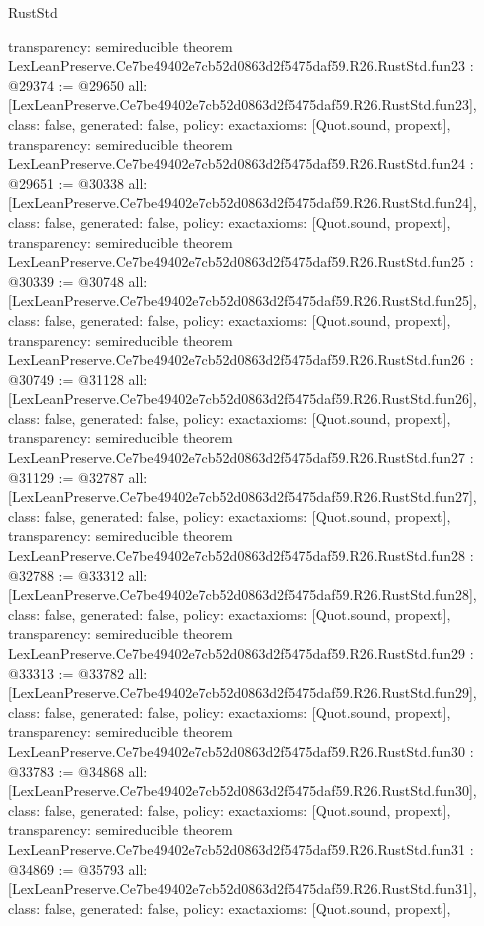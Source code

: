 \begin{lexlean}{RustStd}
\begin{coremodule}
{  transparency: semireducible
}
theorem LexLeanPreserve.Ce7be49402e7cb52d0863d2f5475daf59.R26.RustStd.fun23 : @29374 := @29650 {
  all: [LexLeanPreserve.Ce7be49402e7cb52d0863d2f5475daf59.R26.RustStd.fun23],
  class: false,
  generated: false,
  policy: exact{axioms: [Quot.sound, propext]},
  transparency: semireducible
}
theorem LexLeanPreserve.Ce7be49402e7cb52d0863d2f5475daf59.R26.RustStd.fun24 : @29651 := @30338 {
  all: [LexLeanPreserve.Ce7be49402e7cb52d0863d2f5475daf59.R26.RustStd.fun24],
  class: false,
  generated: false,
  policy: exact{axioms: [Quot.sound, propext]},
  transparency: semireducible
}
theorem LexLeanPreserve.Ce7be49402e7cb52d0863d2f5475daf59.R26.RustStd.fun25 : @30339 := @30748 {
  all: [LexLeanPreserve.Ce7be49402e7cb52d0863d2f5475daf59.R26.RustStd.fun25],
  class: false,
  generated: false,
  policy: exact{axioms: [Quot.sound, propext]},
  transparency: semireducible
}
theorem LexLeanPreserve.Ce7be49402e7cb52d0863d2f5475daf59.R26.RustStd.fun26 : @30749 := @31128 {
  all: [LexLeanPreserve.Ce7be49402e7cb52d0863d2f5475daf59.R26.RustStd.fun26],
  class: false,
  generated: false,
  policy: exact{axioms: [Quot.sound, propext]},
  transparency: semireducible
}
theorem LexLeanPreserve.Ce7be49402e7cb52d0863d2f5475daf59.R26.RustStd.fun27 : @31129 := @32787 {
  all: [LexLeanPreserve.Ce7be49402e7cb52d0863d2f5475daf59.R26.RustStd.fun27],
  class: false,
  generated: false,
  policy: exact{axioms: [Quot.sound, propext]},
  transparency: semireducible
}
theorem LexLeanPreserve.Ce7be49402e7cb52d0863d2f5475daf59.R26.RustStd.fun28 : @32788 := @33312 {
  all: [LexLeanPreserve.Ce7be49402e7cb52d0863d2f5475daf59.R26.RustStd.fun28],
  class: false,
  generated: false,
  policy: exact{axioms: [Quot.sound, propext]},
  transparency: semireducible
}
theorem LexLeanPreserve.Ce7be49402e7cb52d0863d2f5475daf59.R26.RustStd.fun29 : @33313 := @33782 {
  all: [LexLeanPreserve.Ce7be49402e7cb52d0863d2f5475daf59.R26.RustStd.fun29],
  class: false,
  generated: false,
  policy: exact{axioms: [Quot.sound, propext]},
  transparency: semireducible
}
theorem LexLeanPreserve.Ce7be49402e7cb52d0863d2f5475daf59.R26.RustStd.fun30 : @33783 := @34868 {
  all: [LexLeanPreserve.Ce7be49402e7cb52d0863d2f5475daf59.R26.RustStd.fun30],
  class: false,
  generated: false,
  policy: exact{axioms: [Quot.sound, propext]},
  transparency: semireducible
}
theorem LexLeanPreserve.Ce7be49402e7cb52d0863d2f5475daf59.R26.RustStd.fun31 : @34869 := @35793 {
  all: [LexLeanPreserve.Ce7be49402e7cb52d0863d2f5475daf59.R26.RustStd.fun31],
  class: false,
  generated: false,
  policy: exact{axioms: [Quot.sound, propext]},
}
\end{coremodule}
\end{lexlean}
